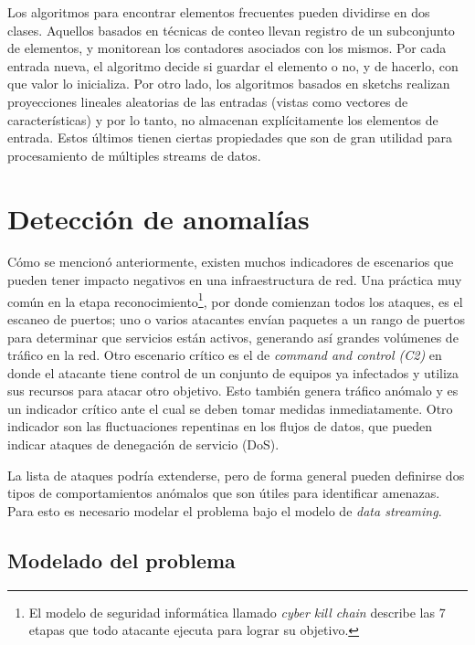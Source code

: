 \documentclass[a4paper,10pt, oneside]{article}
\begin{document}
Los algoritmos para encontrar elementos frecuentes pueden dividirse en dos clases. Aquellos basados en técnicas de conteo llevan registro de un subconjunto de elementos, y monitorean los contadores asociados con los mismos. Por cada entrada nueva, el algoritmo decide si guardar el elemento o no, y de hacerlo, con que valor lo inicializa. Por otro lado, los algoritmos basados en sketchs realizan proyecciones lineales aleatorias de las entradas\cite{Cormode:2008:FFI:1454159.1454225} (vistas como vectores de características) y por lo tanto, no almacenan explícitamente los elementos de entrada. Estos últimos tienen ciertas propiedades que son de gran utilidad para procesamiento de múltiples streams de datos.

\section{Detección de anomalías}
Cómo se mencionó anteriormente, existen muchos indicadores de escenarios que pueden tener impacto negativos en una infraestructura de red. Una práctica muy común en la etapa reconocimiento\footnote{El modelo de seguridad informática llamado \textit{cyber kill chain} describe las 7 etapas que todo atacante ejecuta para lograr su objetivo.\cite{hutchins2011intelligence}}, por donde comienzan todos los ataques, es el escaneo de puertos; uno o varios atacantes envían paquetes a un rango de puertos para determinar que servicios están activos, generando así grandes volúmenes de tráfico en la red. Otro escenario crítico es el de \textit{command and control (C2)} en donde el atacante tiene control de un conjunto de equipos ya infectados y utiliza sus recursos para atacar otro objetivo. Esto también genera tráfico anómalo y es un indicador crítico ante el cual se deben tomar medidas inmediatamente. Otro indicador son las fluctuaciones repentinas en los flujos de datos, que pueden indicar ataques de denegación de servicio (DoS).

La lista de ataques podría extenderse, pero de forma general pueden definirse dos tipos de comportamientos anómalos que son útiles para identificar amenazas. Para esto es necesario modelar el problema bajo el modelo de \textit{data streaming}.

\subsection{Modelado del problema}\label{modelado}
\end{document}

